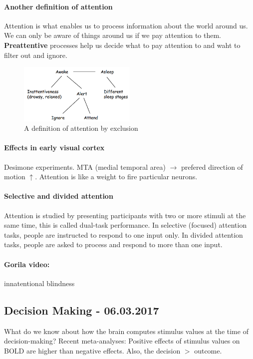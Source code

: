 \documentclass[12pt,article,oneside,a4paper]{memoir}
\begin{document}
\paragraph{Another definition of attention} Attention is what enables us to process information about the world around us. We can only be aware of things around us if we pay attention to them. \textbf{Preattentive} processes help us decide what to pay attention to and waht to filter out and ignore.

\begin{figure}[h]
  \centering
  \includegraphics[width=0.5\textwidth]{imgs/attention.png}
  \caption{A definition of attention by exclusion}
  \label{fig:attention}
\end{figure}

\paragraph{Effects in early visual cortex} Desimone experiments. MTA (medial temporal area) $\rightarrow$ prefered direction of motion $\uparrow$. Attention is like a weight to fire particular neurons.

\paragraph{Selective and divided attention} Attention is studied by presenting participants with two or more stimuli at the same time, this is called dual-task performance. In selective (focused) attention tasks, people are instructed to respond to one input only. In divided attention tasks, people are asked to process and respond to more than one input.

\paragraph{Gorila video:} innatentional blindness

\newpage
\subsection{Decision Making - 06.03.2017}
What do we know about how the brain computes stimulus values at the time of decision-making? Recent meta-analyses: Positive effects of stimulus values on BOLD are higher than negative effects. Also, the decision $>$ outcome.
\end{document}
